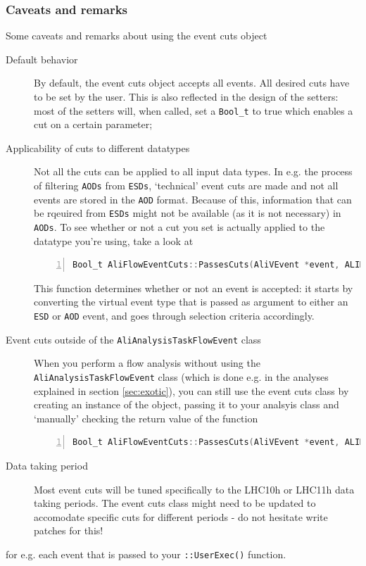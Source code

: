 \documentclass[a4paper]{book}
\numberwithin{equation}{subsection}
\begin{document}
\subsubsection{Caveats and remarks}  
Some caveats and remarks about using the event cuts object
\begin{description}
\item[Default behavior] By default, the event cuts object accepts all events. All desired cuts have to be set by the user. This is also reflected in the design of the setters: most of the setters will, when called, set a \texttt{Bool\_t} to true which enables a cut on a certain parameter;
\item[Applicability of cuts to different datatypes] Not all the cuts can be applied to all input data types. In e.g. the process of filtering \texttt{AODs} from \texttt{ESDs}, `technical' event cuts are made and not all events are stored in the \texttt{AOD} format. Because of this, information that can be rqeuired from \texttt{ESDs} might not be available (as it is not necessary) in \texttt{AODs}. To see whether or not a cut you set is actually applied to the datatype you're using, take a look at
\begin{lstlisting}[language=C, numbers=left]
Bool_t AliFlowEventCuts::PassesCuts(AliVEvent *event, ALIMCEvent *mcevent)\end{lstlisting}
This function determines whether or not an event is accepted: it starts by converting the virtual event type that is passed as argument to either an \texttt{ESD} or \texttt{AOD} event, and goes through selection criteria accordingly. 
\item[Event cuts outside of the \texttt{AliAnalysisTaskFlowEvent} class]
When you perform a flow analysis without using the \texttt{AliAnalysisTaskFlowEvent} class (which is done e.g. in the analyses explained in section \ref{sec:exotic}), you can still use the event cuts class by creating an instance of the object, passing it to your analsyis class and `manually' checking the return value of the function 
\begin{lstlisting}[language=C, numbers=left]
Bool_t AliFlowEventCuts::PassesCuts(AliVEvent *event, ALIMCEvent *mcevent)\end{lstlisting}
\item[Data taking period] Most event cuts will be tuned specifically to the LHC10h or LHC11h data taking periods. The event cuts class might need to be updated to accomodate specific cuts for different periods - do not hesitate write patches for this!
\end{description}
for e.g. each event that is passed to your \texttt{::UserExec()} function.
\end{document}
